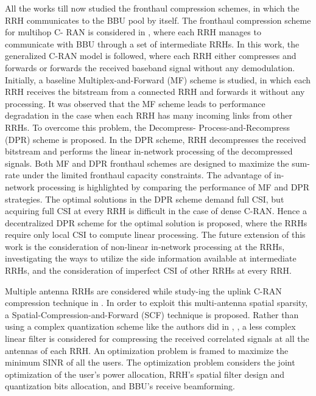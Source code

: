 \begin{multicols}{2}
\begin{itemize}
All the works till now studied the fronthaul compression schemes, in which the RRH communicates to the BBU pool by itself. The fronthaul compression scheme for multihop C- RAN is considered in \cite{art3-key56}, where each RRH manages to communicate with BBU through a set of intermediate RRHs. In this work, the generalized C-RAN model is followed, where each RRH either compresses and forwards or forwards the received baseband signal without any demodulation. Initially, a baseline Multiplex-and-Forward (MF) scheme is studied, in which each RRH receives the bitstream from a connected RRH and forwards it without any processing. It was observed that the MF scheme leads to performance degradation in the case when each RRH has many incoming links from other RRHs. To overcome this problem, the Decompress- Process-and-Recompress (DPR) scheme is proposed. In the DPR scheme, RRH decompresses the received bitstream and performs the linear in-network processing of the decompressed signals. Both MF and DPR fronthaul schemes are designed to maximize the sum-rate under the limited fronthaul capacity constraints. The advantage of in-network processing is highlighted by comparing the performance of MF and DPR strategies. The optimal solutions in the DPR scheme demand full CSI, but acquiring full CSI at every RRH is difficult in the case of dense C-RAN. Hence a decentralized DPR scheme for the optimal solution is proposed, where the RRHs require only local CSI to compute linear processing. The future extension of this work is the consideration of non-linear in-network processing at the RRHs, investigating the ways to utilize the side information available at intermediate RRHs, and the consideration of imperfect CSI of other RRHs at every RRH.



Multiple antenna RRHs are considered while study-ing the uplink C-RAN compression technique in \cite{art3-key57}. In order to exploit this multi-antenna spatial sparsity, a Spatial-Compression-and-Forward (SCF) technique is proposed. Rather than using a complex quantization scheme like the authors did in \cite{art3-key51}, \cite{art3-key53}, a less complex linear filter is considered for compressing the received correlated signals at all the antennas of each RRH. An optimization problem is framed to maximize the minimum SINR of all the users. The optimization problem considers the joint optimization of the user’s power allocation, RRH’s spatial filter design and quantization bits allocation, and BBU’s receive beamforming.


\end{itemize}
\end{multicols}
